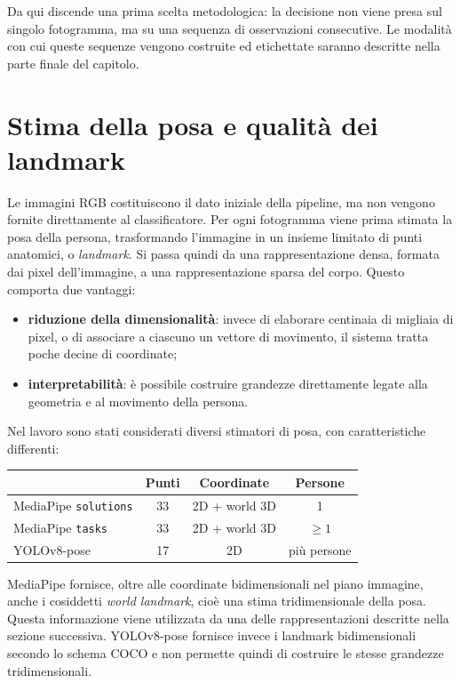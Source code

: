 Da qui discende una prima scelta metodologica: la decisione non viene presa sul singolo fotogramma, ma su una sequenza di osservazioni consecutive. Le modalità con cui queste sequenze vengono costruite ed etichettate saranno descritte nella parte finale del capitolo.

\section{Stima della posa e qualità dei landmark}
\label{sec:pose}

Le immagini RGB costituiscono il dato iniziale della pipeline, ma non vengono fornite direttamente al classificatore. Per ogni fotogramma viene prima stimata la posa della persona, trasformando l'immagine in un insieme limitato di punti anatomici, o \emph{landmark}.
Si passa quindi da una rappresentazione densa, formata dai pixel dell'immagine, a una rappresentazione sparsa del corpo. Questo comporta due vantaggi:
\begin{itemize}
    \item \textbf{riduzione della dimensionalità}: invece di elaborare centinaia di migliaia di pixel, o di associare a ciascuno un vettore di movimento, il sistema tratta poche decine di coordinate;
    \item \textbf{interpretabilità}: è possibile costruire grandezze direttamente legate alla geometria e al movimento della persona.
\end{itemize}

Nel lavoro sono stati considerati diversi stimatori di posa, con caratteristiche differenti:

\begin{center}
\begin{tabular}{lccc}
\toprule
 & Punti & Coordinate & Persone \\
\midrule
MediaPipe \texttt{solutions} & 33 & 2D + world 3D & 1 \\
MediaPipe \texttt{tasks} & 33 & 2D + world 3D & $\geq 1$ \\
YOLOv8-pose & 17 & 2D & più persone \\
\bottomrule
\end{tabular}
\end{center}
\vspace{0.4cm}

MediaPipe fornisce, oltre alle coordinate bidimensionali nel piano immagine, anche i cosiddetti \emph{world landmark}, cioè una stima tridimensionale della posa. Questa informazione viene utilizzata da una delle rappresentazioni descritte nella sezione successiva. YOLOv8-pose fornisce invece i landmark bidimensionali secondo lo schema COCO e non permette quindi di costruire le stesse grandezze tridimensionali.

